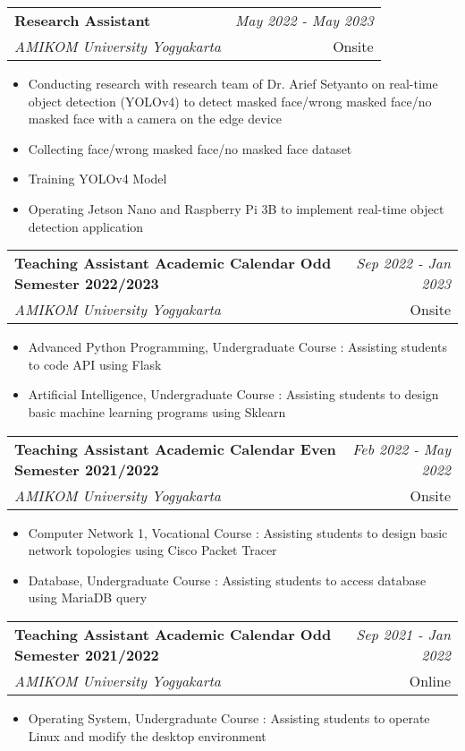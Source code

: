 \documentclass[a4paper,11pt]{article}
\makeatletter
\newcommand{\resumeSubheading}[4]{
\vspace{0.5mm}\item
    \begin{tabular*}{0.98\textwidth}[t]{l@{\extracolsep{\fill}}r}
        \textbf{#1} & \textit{\footnotesize{#4}} \\
        \textit{\footnotesize{#3}} &  \footnotesize{#2}\\
    \end{tabular*}
    \vspace{-2.4mm}
}
\newcommand{\resumeItemListStart}{\begin{justify}\begin{itemize}[leftmargin=3ex, rightmargin=2ex, noitemsep,labelsep=1.2mm,itemsep=0mm]\small}
\newcommand{\resumeItemListEnd}{\end{itemize}\end{justify}\vspace{-2mm}}
\makeatother
\begin{document}
    \vspace{-1.0mm}
    
    \resumeSubheading
      {Research Assistant}{Onsite}
      {AMIKOM University Yogyakarta}{May 2022 - May 2023}
      \vspace{-1.0mm}
      \resumeItemListStart
    \item {Conducting research with research team of Dr. Arief Setyanto on real-time object detection (YOLOv4) to detect masked face/wrong masked face/no masked face with a camera on the edge device}
    \item {Collecting face/wrong masked face/no masked face dataset}
    \item {Training YOLOv4 Model}
    \item {Operating Jetson Nano and Raspberry Pi 3B to implement real-time object detection application}
    \resumeItemListEnd
    
    \vspace{-1.0mm}

    \resumeSubheading
      {Teaching Assistant Academic Calendar Odd Semester 2022/2023}{Onsite}
      {AMIKOM University Yogyakarta}{Sep 2022 - Jan 2023}
      \vspace{-1.0mm}
      \resumeItemListStart
    \item {Advanced Python Programming, Undergraduate Course : Assisting students to code API using Flask}
    \item {Artificial Intelligence, Undergraduate Course : Assisting students to design basic machine learning programs using Sklearn}
    \resumeItemListEnd
    
    \vspace{-1.0mm}

    \resumeSubheading
      {Teaching Assistant Academic Calendar Even Semester 2021/2022}{Onsite}
      {AMIKOM University Yogyakarta}{Feb 2022 - May 2022}
      \vspace{-1.0mm}
      \resumeItemListStart
    \item {Computer Network 1, Vocational Course : Assisting students to design basic network topologies using Cisco Packet Tracer}
    \item {Database, Undergraduate Course : Assisting students to access database using MariaDB query}
    \resumeItemListEnd
    
    \vspace{-1.0mm}

    \resumeSubheading
      {Teaching Assistant Academic Calendar Odd Semester 2021/2022}{Online}
      {AMIKOM University Yogyakarta}{Sep 2021 - Jan 2022}
      \vspace{-1.0mm}
      \resumeItemListStart
    \item {Operating System, Undergraduate Course : Assisting students to operate Linux and modify the desktop environment}
    \resumeItemListEnd
    
\end{document}

